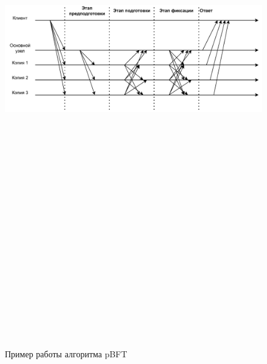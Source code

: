                 \begin{figure}
                    \centering
                    \includegraphics[width=\textwidth,height=25cm,keepaspectratio]{inc/img/BFT.pdf}
                    \caption{Пример работы алгоритма pBFT} \label{fig:pbft}
                \end{figure}

                
